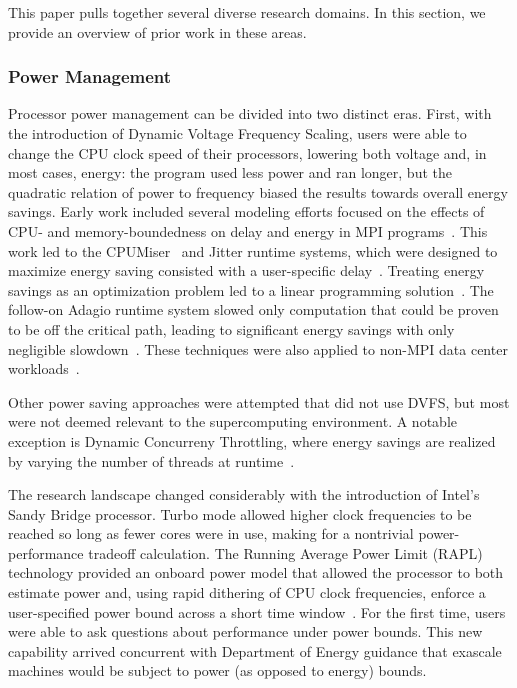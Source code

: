 This paper pulls together several diverse research domains. In this section,
we provide an overview of prior work in these areas.

\subsubsection{Power Management}
Processor power management can be divided into two distinct eras. First, with 
the introduction of Dynamic Voltage Frequency Scaling, users were able to 
change the CPU clock speed of their processors, lowering both voltage and,
in most cases, energy: the program used less power and ran longer, but the
quadratic relation of power to frequency biased the results towards overall
energy savings. Early work included several modeling efforts focused on
the effects of CPU- and memory-boundedness on delay and energy in MPI programs~\cite{SpringerPPoPP2006,GeICPP2007,LiHPCA2006,CameronSC2005,HsuSC2005}. 
This work led to the CPUMiser~\cite{GeICPP2007} and Jitter runtime systems, which were designed 
to maximize energy saving consisted with a user-specific delay~\cite{KappiahSC2005}.
Treating energy savings as an optimization problem led to a linear programming
solution~\cite{rountree:07}. The follow-on Adagio runtime system slowed only
computation that could be proven to be off the critical path, leading to significant
energy savings with only negligible slowdown~\cite{rountree:09}. These 
techniques were also applied to non-MPI data center workloads~\cite{femal:04}. 

Other power saving approaches were attempted that did not use DVFS, but most
were not deemed relevant to the supercomputing environment. A notable exception
is Dynamic Concurreny Throttling, where energy savings are realized by varying
the number of threads at runtime~\cite{Curtis1,Curtis2,Curtis3}.

The research landscape changed considerably with the introduction of Intel's
Sandy Bridge processor. Turbo mode allowed higher clock frequencies to be
reached so long as fewer cores were in use, making for a nontrivial power- performance tradeoff
calculation. The Running Average Power Limit (RAPL) technology provided an onboard power model that allowed the processor to both
estimate power and, using rapid dithering of CPU clock frequencies, enforce a
user-specified power bound across a short time window~\cite{IntelSDM,David2010}. 
For the first time, users were able to ask questions about performance under 
power bounds. This new capability arrived concurrent with Department of Energy
guidance that exascale machines would be subject to power (as opposed to energy) bounds.

